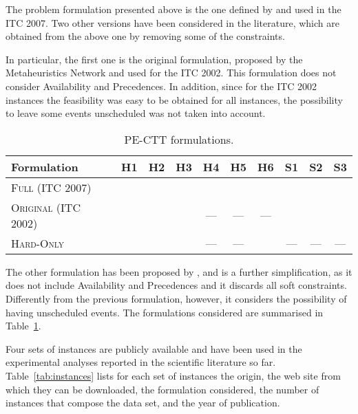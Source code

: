 \documentclass[authoryear,preprint,a4paper,12pt]{elsarticle}
\begin{document}
The problem formulation presented above is the one defined by
\citet{LePM07} and used in the ITC 2007. Two other versions have been
considered in the literature, which are obtained from the above one by
removing some of the constraints.

In particular, the first one is the original formulation, proposed by
the Metaheuristics Network \citep{RSBC03} and used for the ITC 2002.
This formulation does not consider \textsf{Availability} and
\textsf{Precedences}. In addition, since for the ITC 2002 instances
the feasibility was easy to be obtained for all instances, the
possibility to leave some events unscheduled was not taken into account.

\begin{table}
  \centering
  \footnotesize
  \begin{tabular}{|l|*{6}{c}|ccc|} 
    \hline
    Formulation           & H1 & H2 & H3 & H4 & H5 & H6 & S1 & S2 & S3 \\ \hline
    \textsc{Full} (ITC 2007)       &   &   &  &  &  &  &  &  & \\
    \textsc{Original} (ITC 2002) &   &   &  & --- & --- &  --- &  &  &  \\
    \textsc{Hard-Only}             &   &   &  & --- & --- &  & --- & --- & --- \\ \hline
  \end{tabular}
  \caption{PE-CTT formulations.}
  \label{tab:formulations}
\end{table}

The other formulation has been proposed by \cite{LePa05}, and is a
further simplification, as it does not include
\textsf{Availability} and \textsf{Precedences} and it discards
all soft constraints. Differently from the previous formulation,
however, it considers the possibility of having unscheduled events.
The formulations considered are summarised in
Table~\ref{tab:formulations}.

Four sets of instances are publicly available and have been used in
the experimental analyses reported in the scientific literature so far.
Table~\ref{tab:instances} lists for each set of instances the origin,
the web site from which they can be downloaded, the formulation
considered, the number of instances that compose the data set, and the
year of publication.
\end{document}
